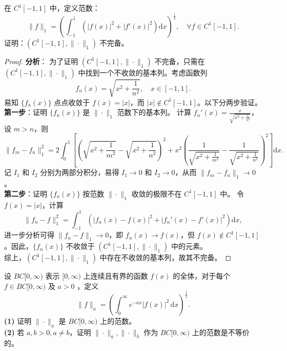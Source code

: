 \documentclass[lang=cn,newtx,10pt,scheme=chinese,thmcnt=chapter]{elegantbook}
\newcommand{\dif}{\mathrm{d}}
\begin{document}
\begin{example}
在 $C^1[-1,1]$ 中，定义范数：
\[
\|f\|_1 = \left( \int_{-1}^1 \left( |f(x)|^2 + |f'(x)|^2 \right) \dif x \right)^{\frac{1}{2}}, \quad \forall f \in C^1[-1,1].
\]
证明：$\left(C^1[-1,1], \|\cdot\|_1\right)$ 不完备。


\end{example}
\begin{proof}
\textbf{分析}：
为了证明 $\left(C^1[-1,1], \|\cdot\|_1\right)$ 不完备，只需在 $\left(C^1[-1,1], \|\cdot\|_1\right)$ 中找到一个不收敛的基本列。考虑函数列
\[
f_n(x) = \sqrt{x^2 + \frac{1}{n^2}}, \quad x \in [-1, 1].
\]
易知 $\{f_n(x)\}$ 点点收敛于 $f(x) = |x|$，而 $|x| \notin C^1[-1,1]$。以下分两步验证。\\
\textbf{第一步}：证明 $\{f_n(x)\}$ 是 $\|\cdot\|_1$ 范数下的基本列。
计算 $f_n'(x) = \frac{x}{\sqrt{x^2 + \frac{1}{n^2}}}$，设 $m > n$，则
\[
\|f_m - f_n\|_1^2 = 2 \int_0^1 \left[ \left( \sqrt{x^2 + \frac{1}{m^2}} - \sqrt{x^2 + \frac{1}{n^2}} \right)^2 
+ x^2 \left( \frac{1}{\sqrt{x^2 + \frac{1}{m^2}}} - \frac{1}{\sqrt{x^2 + \frac{1}{n^2}}} \right)^2 \right] \dif x.
\]
记 $I_1$ 和 $I_2$ 分别为两部分积分，易得 $I_1 \to 0$ 和 $I_2 \to 0$，从而 $\|f_m - f_n\|_1 \to 0$。\\
\textbf{第二步}：证明 $\{f_n(x)\}$ 按范数 $\|\cdot\|_1$ 收敛的极限不在 $C^1[-1,1]$ 中。
令 $f(x) = |x|$，计算
\[
\|f_n - f\|_1^2 = \int_{-1}^1 \left( |f_n(x) - f(x)|^2 + |f_n'(x) - f'(x)|^2 \right) \dif x,
\]
进一步分析可得 $\|f_n - f\|_1 \to 0$，即 $f_n(x) \to f(x)$，但 $f(x) \notin C^1[-1,1]$。因此，$\{f_n(x)\}$ 不收敛于 $\left(C^1[-1,1], \|\cdot\|_1\right)$ 中的元素。\\
综上，$\left(C^1[-1,1], \|\cdot\|_1\right)$ 中存在不收敛的基本列，故其不完备。
\end{proof}
\begin{example}
设 $B C[0, \infty)$ 表示 $[0, \infty)$ 上连续且有界的函数 $f(x)$ 的全体，对于每个 $f \in B C[0, \infty)$ 及 $a > 0$ ，定义
\[
\|f\|_a = \left( \int_0^{\infty} e^{-a x} |f(x)|^2 \, \dif x \right)^{\frac{1}{2}}.
\]
\textbf{(1)} 证明 $\|\cdot\|_a$ 是 $B C[0, \infty)$ 上的范数。\\
\textbf{(2)} 若 $a, b > 0, a \neq b$，证明 $\|\cdot\|_a, \|\cdot\|_b$ 作为 $B C[0, \infty)$ 上的范数是不等价的。\\
\end{example}
\end{document}
